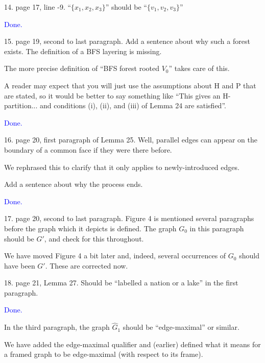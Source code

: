 \documentclass[12pt]{article}
\newcommand{\done}{\textcolor{blue}{Done.}}
\newenvironment{response}{\color{blue}}{}
\begin{document}
14. page 17, line -9. “$\{x_1, x_2, x_3\}$” should be “$\{v_1, v_2, v_3\}$”

\done

15. page 19, second to last paragraph. Add a sentence about why such
a forest exists. The definition of a BFS layering is missing.


\begin{response}
  The more precise definition of ``BFS forest rooted $V_0$'' takes care of this.
\end{response}

A reader may expect that you will just use the assumptions about H and P that are stated, so it would be better to say something like “This gives an H-partition... and conditions (i), (ii), and (iii) of Lemma 24 are satisfied”.

\done


16. page 20, first paragraph of Lemma 25. Well, parallel edges can appear
on the boundary of a common face if they were there before.

\begin{response}
  We rephrased this to clarify that it only applies to newly-introduced edges.
\end{response}


Add a sentence about why the process ends.

\done

17. page 20, second to last paragraph. Figure 4 is mentioned several paragraphs before the graph which it depicts is defined. The graph $G_0$ in
this paragraph should be $G'$, and check for this throughout.

\begin{response}
  We have moved Figure 4 a bit later and, indeed, several occurrences of $G_0$ should have been $G'$.  These are corrected now.
\end{response}

18. page 21, Lemma 27. Should be “labelled a nation or a lake” in the
first paragraph.

\done

In the third paragraph, the graph $\hat{G}_1$ should be “edge-maximal” or similar.

\begin{response}
  We have added the edge-maximal qualifier and (earlier) defined what it means for a framed graph to be edge-maximal (with respect to its frame).
\end{response}
\end{document}
